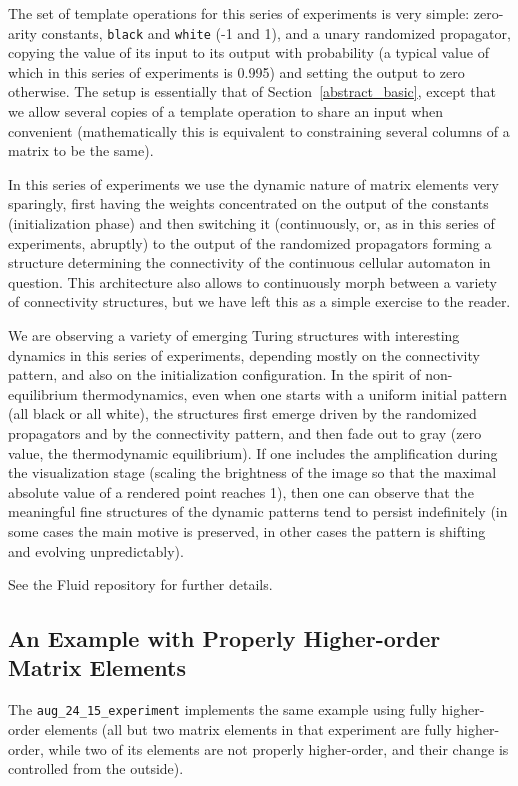 \documentclass[withtimes]{easychair}
\begin{document}
The set of template operations for this series of experiments is very simple: zero-arity
constants, {\tt black} and {\tt white} (-1 and 1), and a unary randomized propagator,
copying the value of its input  to its output  with probability  (a typical
value of which in this series of experiments is 0.995) and setting the output to zero
otherwise. The setup is essentially that of Section~\ref{abstract_basic}, except that
we allow several copies of a template operation to share an input when convenient
(mathematically this is equivalent to constraining several columns of a matrix to be the same).

In this series of experiments we use the dynamic nature of matrix elements very
sparingly, first having the weights concentrated on the output of the constants
(initialization phase) and then switching it (continuously, or, as in this series
of experiments, abruptly) to the output of the randomized propagators
forming a structure determining the connectivity
of the continuous cellular automaton in question. This architecture also allows to
continuously morph between a variety of connectivity structures, but
we have left this as a simple exercise to the reader.

We are observing a variety of emerging Turing structures with interesting dynamics
in this series of experiments, depending mostly on the connectivity pattern,
and also on the initialization configuration. In the spirit of non-equilibrium
thermodynamics, even when one starts with a uniform
initial pattern (all black or all white), the structures first emerge driven by the randomized propagators
and by the connectivity pattern, and then fade out to gray (zero value, the thermodynamic
equilibrium). If one includes the amplification during the visualization stage
(scaling the brightness of the image so that the maximal absolute value of a rendered point reaches 1),
then one can observe that the meaningful fine structures of the dynamic patterns
tend to persist indefinitely (in some cases the main motive is preserved, in
other cases the pattern is shifting and evolving unpredictably).

See the Fluid repository for further details.

\subsection{An Example with Properly Higher-order Matrix Elements}

The {\tt aug\_24\_15\_experiment} implements the same example using fully higher-order elements
(all but two matrix elements in that experiment are fully higher-order, while two of its elements are not properly
higher-order, and their change is controlled from the outside).
\end{document}
